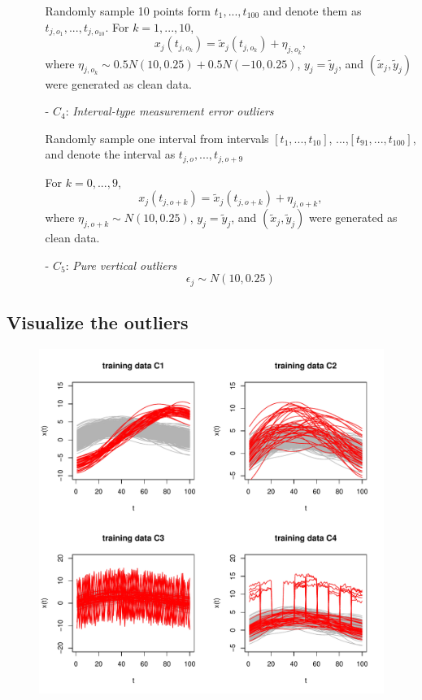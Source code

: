\documentclass{article}
\begin{document}
\begin{itemize}
\begin{itemize}
       \vspace{1ex}
   Randomly sample 10  points form $t_1,..., t_{100}$ and denote them as $t_{j,o_1},..., t_{j,o_{10}}$. For $k = 1,..., 10$,   
    $$x_{j}(t_{j,o_k}) = \tilde{x}_j(t_{j,o_k}) + \eta_{j,o_k},$$ where $\eta_{j,o_k} \sim 0.5 N(10, 0.25) + 0.5 N(-10, 0.25)$, $y_j = \tilde{y}_j$, and 
 $(\tilde{x}_j, \tilde{y}_j)$ were generated as clean data. 
    \vspace{1ex}
    \item[- ] $C_4$: \textit{Interval-type measurement error outliers} 
    
       \vspace{1ex}
     Randomly sample one interval from intervals $[t_1,...,t_{10}]$, ...,$[t_{91},...,t_{100}]$,   and denote the interval as $t_{j,o},..., t_{j,o+9}$
     
     For $k = 0,..., 9$,   
    $$x_{j}(t_{j,o + k}) = \tilde{x}_j(t_{j,o + k}) + \eta_{j,o+k},$$ where $\eta_{j,o + k} \sim  N(10, 0.25)$, $y_j = \tilde{y}_j$, and 
 $(\tilde{x}_j, \tilde{y}_j)$ were generated as clean data. 
    \vspace{1ex}
 
    \item[- ] $C_5$: \textit{Pure vertical outliers} 
       \vspace{1ex}
   $$\epsilon_{j} \sim N(10, 0.25)$$
\end{itemize}
\end{itemize}


\subsection{Visualize the outliers}

\begin{figure}[H]
    \centering
    \includegraphics[scale = 0.8]{visualize_outliers.pdf}
\end{figure}
\end{document}
